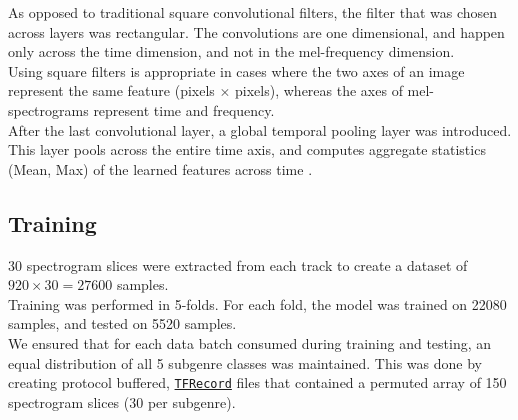 \documentclass[12pt]{article}
\newcounter{ct}
\begin{document}
\begin{center}
\end{center}
As opposed to traditional square convolutional filters, 
the filter that was chosen across layers was rectangular. 
The convolutions are one dimensional, and happen only across
the time dimension, and not in the mel-frequency dimension.\\
Using square filters is appropriate in cases where
the two axes of an image represent the same feature (pixels $\times$ pixels),
whereas the axes of mel-spectrograms represent time and frequency.\\
After the last convolutional layer, a global temporal pooling layer
was introduced. This layer pools across the entire time 
axis, and computes aggregate statistics (Mean, Max) of the learned 
features across time \cite{c4}.

\subsection*{Training}
30 spectrogram slices were extracted from each track to create a dataset
of $920\times30=27600$ samples.\\
Training was performed in 5-folds. For each fold, 
the model was trained on 22080 samples, and tested 
on 5520 samples. \\
We ensured that for each data batch consumed during training and 
testing, an equal distribution of all 5 subgenre classes 
was maintained.
This was done by creating protocol buffered,
\href{https://www.tensorflow.org/tutorials/load_data/tf-records}
{\tt TFRecord} files that contained a permuted array of 
150 spectrogram slices (30 per subgenre). 
\end{document}
